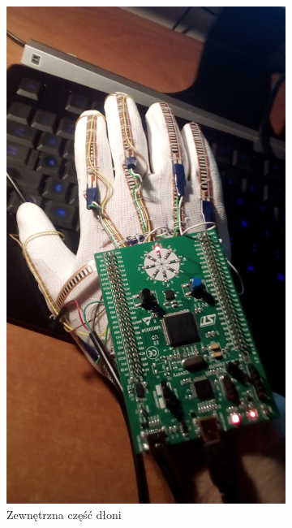 \documentclass[12pt,a4paper]{article}
\begin{document}
\begin{figure}[h]
\centering
\begin{subfigure}{.5\textwidth}
	\centering
	\includegraphics[width=.9\textwidth]{images/gotowa.jpg}
	\caption{Zewnętrzna część dłoni}
	\label{fig:gotowa}
\end{subfigure}%
\begin{subfigure}{.5\textwidth}
	\centering

\end{subfigure}
\end{figure}
\end{document}
